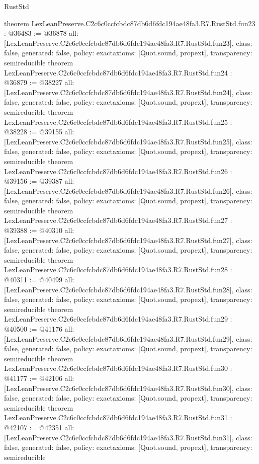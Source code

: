 \begin{lexlean}{RustStd}
\begin{coremodule}
{}
theorem LexLeanPreserve.C2c6c0ccfcbdc87db6d6fdc194ae48fa3.R7.RustStd.fun23 : @36483 := @36878 {
  all: [LexLeanPreserve.C2c6c0ccfcbdc87db6d6fdc194ae48fa3.R7.RustStd.fun23],
  class: false,
  generated: false,
  policy: exact{axioms: [Quot.sound, propext]},
  transparency: semireducible
}
theorem LexLeanPreserve.C2c6c0ccfcbdc87db6d6fdc194ae48fa3.R7.RustStd.fun24 : @36879 := @38227 {
  all: [LexLeanPreserve.C2c6c0ccfcbdc87db6d6fdc194ae48fa3.R7.RustStd.fun24],
  class: false,
  generated: false,
  policy: exact{axioms: [Quot.sound, propext]},
  transparency: semireducible
}
theorem LexLeanPreserve.C2c6c0ccfcbdc87db6d6fdc194ae48fa3.R7.RustStd.fun25 : @38228 := @39155 {
  all: [LexLeanPreserve.C2c6c0ccfcbdc87db6d6fdc194ae48fa3.R7.RustStd.fun25],
  class: false,
  generated: false,
  policy: exact{axioms: [Quot.sound, propext]},
  transparency: semireducible
}
theorem LexLeanPreserve.C2c6c0ccfcbdc87db6d6fdc194ae48fa3.R7.RustStd.fun26 : @39156 := @39387 {
  all: [LexLeanPreserve.C2c6c0ccfcbdc87db6d6fdc194ae48fa3.R7.RustStd.fun26],
  class: false,
  generated: false,
  policy: exact{axioms: [Quot.sound, propext]},
  transparency: semireducible
}
theorem LexLeanPreserve.C2c6c0ccfcbdc87db6d6fdc194ae48fa3.R7.RustStd.fun27 : @39388 := @40310 {
  all: [LexLeanPreserve.C2c6c0ccfcbdc87db6d6fdc194ae48fa3.R7.RustStd.fun27],
  class: false,
  generated: false,
  policy: exact{axioms: [Quot.sound, propext]},
  transparency: semireducible
}
theorem LexLeanPreserve.C2c6c0ccfcbdc87db6d6fdc194ae48fa3.R7.RustStd.fun28 : @40311 := @40499 {
  all: [LexLeanPreserve.C2c6c0ccfcbdc87db6d6fdc194ae48fa3.R7.RustStd.fun28],
  class: false,
  generated: false,
  policy: exact{axioms: [Quot.sound, propext]},
  transparency: semireducible
}
theorem LexLeanPreserve.C2c6c0ccfcbdc87db6d6fdc194ae48fa3.R7.RustStd.fun29 : @40500 := @41176 {
  all: [LexLeanPreserve.C2c6c0ccfcbdc87db6d6fdc194ae48fa3.R7.RustStd.fun29],
  class: false,
  generated: false,
  policy: exact{axioms: [Quot.sound, propext]},
  transparency: semireducible
}
theorem LexLeanPreserve.C2c6c0ccfcbdc87db6d6fdc194ae48fa3.R7.RustStd.fun30 : @41177 := @42106 {
  all: [LexLeanPreserve.C2c6c0ccfcbdc87db6d6fdc194ae48fa3.R7.RustStd.fun30],
  class: false,
  generated: false,
  policy: exact{axioms: [Quot.sound, propext]},
  transparency: semireducible
}
theorem LexLeanPreserve.C2c6c0ccfcbdc87db6d6fdc194ae48fa3.R7.RustStd.fun31 : @42107 := @42351 {
  all: [LexLeanPreserve.C2c6c0ccfcbdc87db6d6fdc194ae48fa3.R7.RustStd.fun31],
  class: false,
  generated: false,
  policy: exact{axioms: [Quot.sound, propext]},
  transparency: semireducible
}
\end{coremodule}
\end{lexlean}

